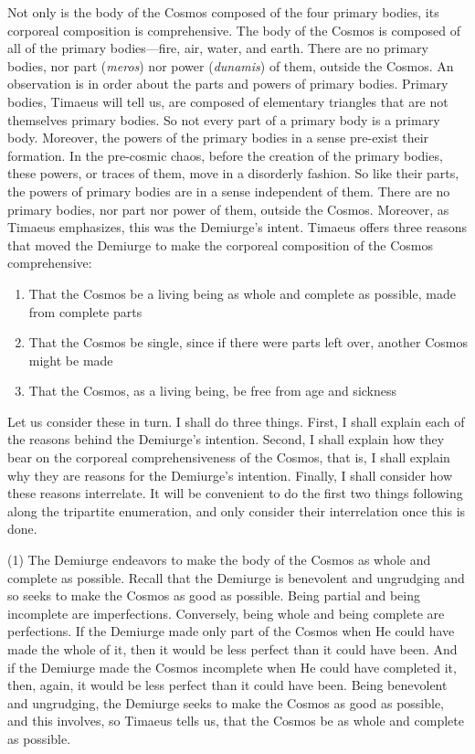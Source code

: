 Not only is the body of the Cosmos composed of the four primary bodies, its corporeal composition is comprehensive. The body of the Cosmos is composed of all of the primary bodies---fire, air, water, and earth. There are no primary bodies, nor part (\emph{meros}) nor power (\emph{dunamis}) of them, outside the Cosmos. An observation is in order about the parts and powers of primary bodies. Primary bodies, Timaeus will tell us, are composed of elementary triangles that are not themselves primary bodies. So not every part of a primary body is a primary body. Moreover, the powers of the primary bodies in a sense pre-exist their formation. In the pre-cosmic chaos, before the creation of the primary bodies, these powers, or traces of them, move in a disorderly fashion. So like their parts, the powers of primary bodies are in a sense independent of them. There are no primary bodies, nor part nor power of them, outside the Cosmos. Moreover, as Timaeus emphasizes, this was the Demiurge's intent. Timaeus offers three reasons that moved the Demiurge to make the corporeal composition of the Cosmos comprehensive:
\begin{enumerate}[(1)]
	\item That the Cosmos be a living being as whole and complete as possible, made from complete parts
	\item That the Cosmos be single, since if there were parts left over, another Cosmos might be made
	\item That the Cosmos, as a living being, be free from age and sickness
\end{enumerate}
Let us consider these in turn. I shall do three things. First, I shall explain each of the reasons behind the Demiurge's intention. Second, I shall explain how they bear on the corporeal comprehensiveness of the Cosmos, that is, I shall explain why they are reasons for the Demiurge's intention. Finally, I shall consider how these reasons interrelate. It will be convenient to do the first two things following along the tripartite enumeration, and only consider their interrelation once this is done.

(1) The Demiurge endeavors to make the body of the Cosmos as whole and complete as possible. Recall that the Demiurge is benevolent and ungrudging and so seeks to make the Cosmos as good as possible. Being partial and being incomplete are imperfections. Conversely, being whole and being complete are perfections. If the Demiurge made only part of the Cosmos when He could have made the whole of it, then it would be less perfect than it could have been. And if the Demiurge made the Cosmos incomplete when He could have completed it, then, again, it would be less perfect than it could have been. Being benevolent and ungrudging, the Demiurge seeks to make the Cosmos as good as possible, and this involves, so Timaeus tells us, that the Cosmos be as whole and complete as possible.

